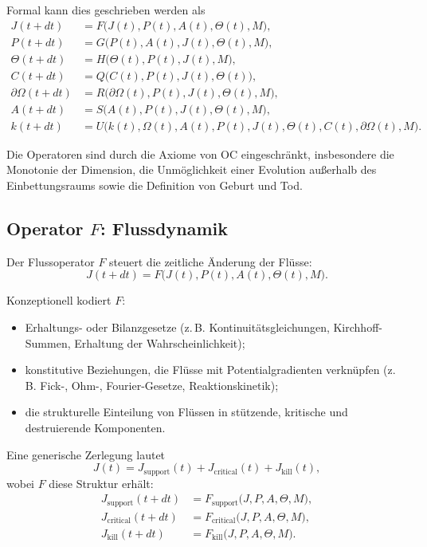 Formal kann dies geschrieben werden als
\begin{align*}
  J(t+dt)              &= F\big(J(t), P(t), A(t), \Theta(t), M\big), \\
  P(t+dt)              &= G\big(P(t), A(t), J(t), \Theta(t), M\big), \\
  \Theta(t+dt)         &= H\big(\Theta(t), P(t), J(t), M\big), \\
  C(t+dt)              &= Q\big(C(t), P(t), J(t), \Theta(t)\big), \\
  \partial\Omega(t+dt) &= R\big(\partial\Omega(t), P(t), J(t), \Theta(t), M\big), \\
  A(t+dt)              &= S\big(A(t), P(t), J(t), \Theta(t), M\big), \\
  k(t+dt)              &= U\big(k(t), \Omega(t), A(t), P(t), J(t),
                               \Theta(t), C(t), \partial\Omega(t), M\big).
\end{align*}

Die Operatoren sind durch die Axiome von OC eingeschränkt, insbesondere die
Monotonie der Dimension, die Unmöglichkeit einer Evolution außerhalb des
Einbettungsraums sowie die Definition von Geburt und Tod.

\subsection{Operator \texorpdfstring{\texorpdfstring{$F$}{F}}{F}: Flussdynamik}

Der Flussoperator \(F\) steuert die zeitliche Änderung der Flüsse:
\[
  J(t+dt) = F\big(J(t), P(t), A(t), \Theta(t), M\big).
\]

Konzeptionell kodiert \(F\):
\begin{itemize}
  \item Erhaltungs- oder Bilanzgesetze (z.\,B. Kontinuitätsgleichungen,
        Kirchhoff-Summen, Erhaltung der Wahrscheinlichkeit);
  \item konstitutive Beziehungen, die Flüsse mit Potentialgradienten
        verknüpfen (z.\,B. Fick-, Ohm-, Fourier-Gesetze, Reaktionskinetik);
  \item die strukturelle Einteilung von Flüssen in stützende, kritische und
        destruierende Komponenten.
\end{itemize}

Eine generische Zerlegung lautet
\[
  J(t) = J_{\mathrm{support}}(t)
       + J_{\mathrm{critical}}(t)
       + J_{\mathrm{kill}}(t),
\]
wobei \(F\) diese Struktur erhält:
\begin{align*}
  J_{\mathrm{support}}(t+dt)
    &= F_{\mathrm{support}}\big(J, P, A, \Theta, M\big), \\
  J_{\mathrm{critical}}(t+dt)
    &= F_{\mathrm{critical}}\big(J, P, A, \Theta, M\big), \\
  J_{\mathrm{kill}}(t+dt)
    &= F_{\mathrm{kill}}\big(J, P, A, \Theta, M\big).
\end{align*}

